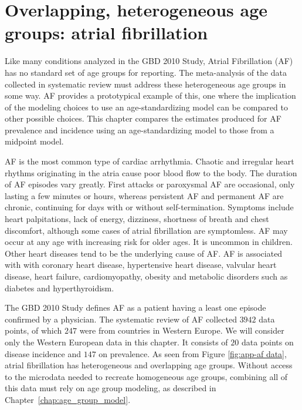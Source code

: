 \chapter{Overlapping, heterogeneous age groups: atrial fibrillation}
\label{applications-age_groups}

Like many conditions analyzed in the GBD 2010 Study, Atrial
Fibrillation (AF) has no standard set of age groups for reporting.  The
meta-analysis of the data collected in systematic review must address
these heterogeneous age groups in some way. AF provides a prototypical
example of this, one where the implication of the modeling choices to
use an age-standardizing model can be compared to other possible
choices.  This chapter compares the estimates produced for AF
prevalence and incidence using an age-standardizing model to those
from a midpoint model.

AF is the most common type of cardiac arrhythmia.  Chaotic and
irregular heart rhythms originating in the atria cause poor blood flow
to the body.  The duration of AF episodes vary greatly.  First attacks
or paroxysmal AF are occasional, only lasting a few minutes or hours,
whereas persistent AF and permanent AF are chronic, continuing for
days with or without self-termination.  Symptoms include
heart palpitations, lack of energy, dizziness, shortness of breath and
chest discomfort, although some cases of atrial fibrillation are
symptomless.  AF may occur at any age with increasing risk for older
ages.  It is uncommon in children.  Other heart diseases tend to be
the underlying cause of AF.  AF is associated with with coronary heart
disease, hypertensive heart disease, valvular heart disease, heart
failure, cardiomyopathy, obesity and metabolic disorders such as
diabetes and hyperthyroidism. \cite{rich_epidemiology_2009,
  rho_asymptomatic_2005, fuster_acc/aha/esc_2006, radford_atrial_1977,
  TK_ref_from_Mehrdad}

The GBD 2010 Study defines AF as a patient having a least one episode
confirmed by a physician.  The systematic review of AF collected $3942$
data points, of which $247$ were from countries in Western Europe.  We
will consider only the Western European data in this chapter. It
consists of $20$ data points on disease incidence and $147$ on prevalence.
As seen from Figure \ref{fig:app-af data}, atrial fibrillation has
heterogeneous and overlapping age groups.  Without access to the
microdata needed to recreate homogeneous age groups, combining all of
this data must rely on age group modeling, as described in
Chapter~\ref{chap:age_group_model}.

